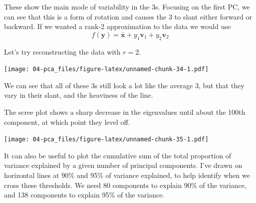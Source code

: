 \documentclass[
]{book}
\newenvironment{Shaded}{\begin{snugshade}}{\end{snugshade}}
\newcommand{\AttributeTok}[1]{\textcolor[rgb]{0.77,0.63,0.00}{#1}}
\newcommand{\CommentTok}[1]{\textcolor[rgb]{0.56,0.35,0.01}{\textit{#1}}}
\newcommand{\DecValTok}[1]{\textcolor[rgb]{0.00,0.00,0.81}{#1}}
\newcommand{\FunctionTok}[1]{\textcolor[rgb]{0.00,0.00,0.00}{#1}}
\newcommand{\NormalTok}[1]{#1}
\newcommand{\OtherTok}[1]{\textcolor[rgb]{0.56,0.35,0.01}{#1}}
\newcommand{\SpecialCharTok}[1]{\textcolor[rgb]{0.00,0.00,0.00}{#1}}
\theoremstyle{definition}
\theoremstyle{definition}
\theoremstyle{definition}
\theoremstyle{definition}
\theoremstyle{remark}
\begin{document}
These show the main mode of variability in the 3s. Focusing on the first PC, we can see that this is a form of rotation and causes the 3 to slant either forward or backward. If we wanted a rank-2 approximation to the data we would use
\[f(\mathbf y) = \bar{\mathbf x} + y_1 \mathbf v_1 + y_2 \mathbf v_2\]

Let's try reconstructing the data with \(r=2\).

\begin{Shaded}
\end{Shaded}

\texttt{[image: 04-pca\_files/figure-latex/unnamed-chunk-34-1.pdf]}

We can see that all of these 3s still look a lot like the average 3, but that they vary in their slant, and the heaviness of the line.

The scree plot shows a sharp decrease in the eigenvalues until about the 100th component, at which point they level off.

\begin{Shaded}
\end{Shaded}

\texttt{[image: 04-pca\_files/figure-latex/unnamed-chunk-35-1.pdf]}

It can also be useful to plot the cumulative sum of the total proportion of variance explained by a given number of principal components. I've drawn on horizontal lines at 90\% and 95\% of variance explained, to help identify when we cross these thresholds.
We need 80 components to explain 90\% of the variance, and 138 components to explain 95\% of the variance.
\end{document}
